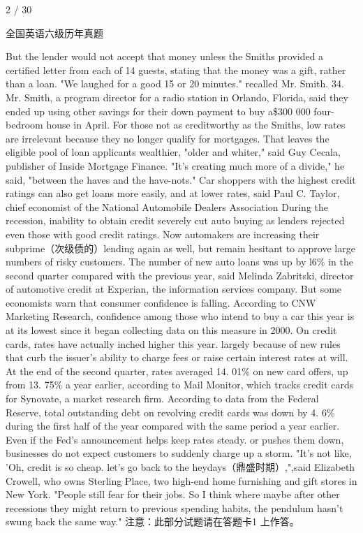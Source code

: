 \documentclass[UTF8,11pt]{ctexart}
\begin{document}
2 / 30


全国英语六级历年真题


But the lender would not accept that money unless the Smiths provided a certified letter from each of 14 guests, stating that the money was a gift, rather than a loan. "We laughed for a good 15 or 20 minutes." recalled Mr. Smith. 34. Mr. Smith, a program director for a radio station in Orlando, Florida, said they ended up using other savings for their down payment to buy a\$300 000 four-bedroom house in April. For those not as creditworthy as the Smiths, low rates are irrelevant because they no longer qualify for mortgages. That leaves the eligible pool of loan applicants wealthier, "older and whiter," said Guy Cecala, publisher of Inside Mortgage Finance. "It's creating much more of a divide," he said, "between the haves and the have-nots." Car shoppers with the highest credit ratings can also get loans more easily, and at lower rates, said Paul C. Taylor, chief economist of the National Automobile Dealers Association During the recession, inability to obtain credit severely cut auto buying as lenders rejected even those with good credit ratings. Now automakers are increasing their subprime（次级债的）lending again as well, but remain hesitant to approve large numbers of risky customers. The number of new auto loans was up by l6\% in the second quarter compared with the previous year, said Melinda Zabritski, director of automotive credit at Experian, the information services company. But some economists warn that consumer confidence is falling. According to CNW Marketing Research, confidence among those who intend to buy a car this year is at its lowest since it began collecting data on this measure in 2000. On credit cards, rates have actually inched higher this year. largely because of new rules that curb the issuer's ability to charge fees or raise certain interest rates at will. At the end of the second quarter, rates averaged 14. 01\% on new card offers, up from 13. 75\% a year earlier, according to Mail Monitor, which tracks credit cards for Synovate, a market research firm. According to data from the Federal Reserve, total outstanding debt on revolving credit cards was down by 4. 6\% during the first half of the year compared with the same period a year earlier. Even if the Fed's announcement helps keep rates steady. or pushes them down, businesses do not expect customers to suddenly charge up a storm. "It's not like, 'Oh, credit is so cheap. let's go back to the heydays（鼎盛时期）,",said Elizabeth Crowell, who owns Sterling Place, two high-end home furnishing and gift stores in New York. "People still fear for their jobs. So I think where maybe after other recessions they might return to previous spending habits, the pendulum hasn't swung back the same way." 注意：此部分试题请在答题卡1 上作答。
\end{document}
